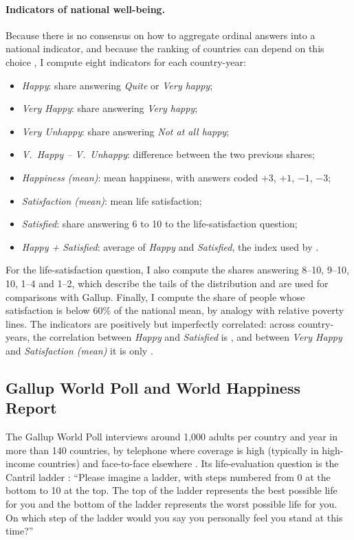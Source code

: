 \documentclass[12pt]{article}
\begin{document}
\ifshowregion
\paragraph{Indicators of national well-being.}
Because there is no consensus on how to aggregate ordinal answers into a national indicator, and because the ranking of countries can depend on this choice \citep{bond_sad_2019}, I compute eight indicators for each country-year:
\begin{itemize}
    \item \textit{Happy}: share answering \textit{Quite} or \textit{Very happy};
    \item \textit{Very Happy}: share answering \textit{Very happy};
    \item \textit{Very Unhappy}: share answering \textit{Not at all happy};
    \item \textit{V.~Happy -- V.~Unhappy}: difference between the two previous shares;
    \item \textit{Happiness (mean)}: mean happiness, with answers coded $+3$, $+1$, $-1$, $-3$;
    \item \textit{Satisfaction (mean)}: mean life satisfaction;
    \item \textit{Satisfied}: share answering 6 to 10 to the life-satisfaction question;
    \item \textit{Happy + Satisfied}: average of \textit{Happy} and \textit{Satisfied}, the index used by \citet{inglehart_genes_2000}.
\end{itemize}
For the life-satisfaction question, I also compute the shares answering 8--10, 9--10, 10, 1--4 and 1--2, which describe the tails of the distribution and are used for comparisons with Gallup. Finally, I compute the share of people whose satisfaction is below 60\% of the national mean, by analogy with relative poverty lines. The indicators are positively but imperfectly correlated: across country-years, the correlation between \textit{Happy} and \textit{Satisfied} is \corHappySatisfied, and between \textit{Very Happy} and \textit{Satisfaction (mean)} it is only \corVeryHappySatisfiedMean.
\fi

\subsection{Gallup World Poll and World Happiness Report}\label{subsec:gallup}

The Gallup World Poll interviews around 1,000 adults per country and year in more than 140 countries, by telephone where coverage is high (typically in high-income countries) and face-to-face elsewhere \citep{gallup_methodology_2022}. Its life-evaluation question is the Cantril ladder \citep{cantril_pattern_1965}: ``Please imagine a ladder, with steps numbered from 0 at the bottom to 10 at the top. The top of the ladder represents the best possible life for you and the bottom of the ladder represents the worst possible life for you. On which step of the ladder would you say you personally feel you stand at this time?''
\end{document}
